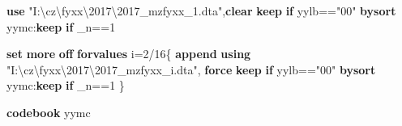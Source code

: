 \documentclass[
]{book}
\newenvironment{Shaded}{\begin{snugshade}}{\end{snugshade}}
\newcommand{\CharTok}[1]{\textcolor[rgb]{0.31,0.60,0.02}{#1}}
\newcommand{\DataTypeTok}[1]{\textcolor[rgb]{0.13,0.29,0.53}{#1}}
\newcommand{\KeywordTok}[1]{\textcolor[rgb]{0.13,0.29,0.53}{\textbf{#1}}}
\newcommand{\NormalTok}[1]{#1}
\newcommand{\StringTok}[1]{\textcolor[rgb]{0.31,0.60,0.02}{#1}}
\begin{document}
\begin{Shaded}
\begin{Highlighting}[]
\KeywordTok{use} \StringTok{"I:\textbackslash{}cz}\CharTok{\textbackslash{}f}\StringTok{yxx\textbackslash{}2017\textbackslash{}2017\_mzfyxx\_1.dta"}\NormalTok{,}\KeywordTok{clear}
\KeywordTok{keep} \KeywordTok{if}\NormalTok{ yylb==}\StringTok{"00"}
\KeywordTok{bysort}\NormalTok{ yymc:}\KeywordTok{keep} \KeywordTok{if} \DataTypeTok{\_n}\NormalTok{==1}

\KeywordTok{set} \KeywordTok{more} \KeywordTok{off}
\KeywordTok{forvalues}\NormalTok{ i=2/16\{}
\KeywordTok{append} \KeywordTok{using} \StringTok{"I:\textbackslash{}cz}\CharTok{\textbackslash{}f}\StringTok{yxx\textbackslash{}2017\textbackslash{}2017\_mzfyxx\_\textasciigrave{}i\textquotesingle{}.dta"}\NormalTok{, }\KeywordTok{force}
\KeywordTok{keep} \KeywordTok{if}\NormalTok{ yylb==}\StringTok{"00"}
\KeywordTok{bysort}\NormalTok{ yymc:}\KeywordTok{keep} \KeywordTok{if} \DataTypeTok{\_n}\NormalTok{==1}
\NormalTok{\}}

\KeywordTok{codebook}\NormalTok{ yymc}
\end{Highlighting}
\end{Shaded}


\printbibliography
\end{document}
